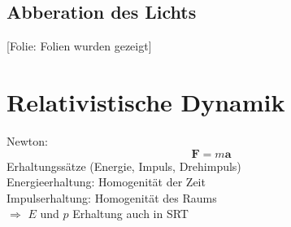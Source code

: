 \documentclass[titlepage,11pt,a4paper,ngerman]{report}
\newcommand{\folie}[1]{\color{gray}[Folie: #1]\color{black}}
\renewcommand{\vec}[1]{\boldsymbol{#1}}
\begin{document}
\subsection{Abberation des Lichts}

\folie{Folien wurden gezeigt}

\section{Relativistische Dynamik}
Newton: \begin{equation*}
\vec{F} = m \vec{a}
\end{equation*}
Erhaltungssätze (Energie, Impuls, Drehimpuls)\\[5pt]
Energieerhaltung: Homogenität der Zeit\\
Impulserhaltung: Homogenität des Raums\\[5pt]
$ \Rightarrow $ $ E $ und $ p $ Erhaltung auch in SRT
\end{document}
